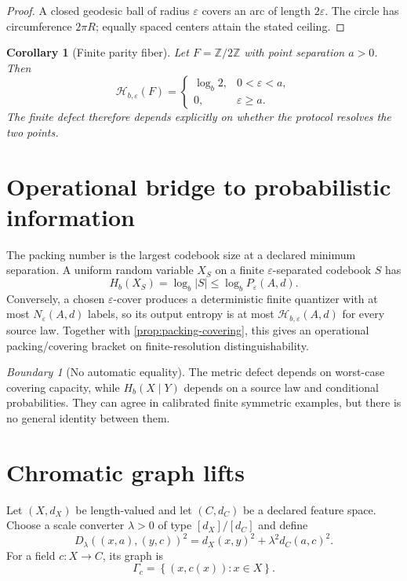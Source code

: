 \documentclass[11pt,a4paper]{article}
\theoremstyle{definition}
\theoremstyle{plain}
\newtheorem{corollary}[definition]{Corollary}
\theoremstyle{remark}
\newtheorem{warning}[definition]{Boundary}
\newcommand{\Hmet}{\mathscr{H}}
\newcommand{\abs}[1]{\left\lvert #1\right\rvert}
\newcommand{\set}[1]{\left\{#1\right\}}
\begin{document}
\begin{proof}
A closed geodesic ball of radius $\varepsilon$ covers an arc of length
$2\varepsilon$. The circle has circumference $2\pi R$; equally spaced
centers attain the stated ceiling.
\end{proof}

\begin{corollary}[Finite parity fiber]
Let $F=\mathbb{Z}/2\mathbb{Z}$ with point separation $a>0$. Then
\[
\Hmet_{b,\varepsilon}(F)
=
\begin{cases}
\log_b2,&0<\varepsilon<a,\\
0,&\varepsilon\geq a.
\end{cases}
\]
The finite defect therefore depends explicitly on whether the protocol
resolves the two points.
\end{corollary}

\section{Operational bridge to probabilistic information}

The packing number is the largest codebook size at a declared minimum
separation. A uniform random variable $X_S$ on a finite
$\varepsilon$-separated codebook $S$ has
\[
H_b(X_S)=\log_b\abs{S}
\leq
\log_bP_\varepsilon(A,d).
\]
Conversely, a chosen $\varepsilon$-cover produces a deterministic
finite quantizer with at most $N_\varepsilon(A,d)$ labels, so its output
entropy is at most $\Hmet_{b,\varepsilon}(A,d)$ for every source law.
Together with \cref{prop:packing-covering}, this gives an operational
packing/covering bracket on finite-resolution distinguishability.

\begin{warning}[No automatic equality]
The metric defect depends on worst-case covering capacity, while
$H_b(X\mid Y)$ depends on a source law and conditional probabilities.
They can agree in calibrated finite symmetric examples, but there is no
general identity between them.
\end{warning}

\section{Chromatic graph lifts}

Let $(X,d_X)$ be length-valued and let $(C,d_C)$ be a declared feature
space. Choose a scale converter $\lambda>0$ of type
$[d_X]/[d_C]$ and define
\[
D_\lambda((x,a),(y,c))^2
=
d_X(x,y)^2+\lambda^2d_C(a,c)^2.
\]
For a field $c:X\to C$, its graph is
\[
\Gamma_c=\set{(x,c(x)):x\in X}.
\]
\end{document}

